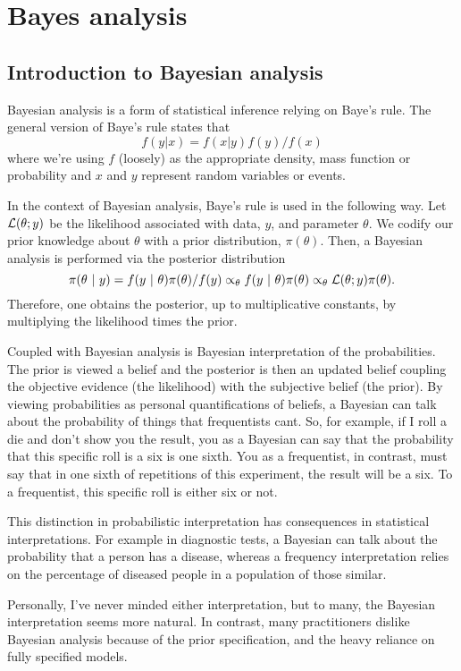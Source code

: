\chapter{Bayes analysis}

\section{Introduction to Bayesian analysis}

Bayesian analysis is a form of statistical inference
relying on Baye's rule. The general version of Baye's rule states
that 
$$
f(y | x) = f(x | y) f(y) / f(x)
$$
where we're using $f$ (loosely) as the appropriate density, mass function
or probability and $x$ and $y$ represent random variables or events. 

In the context of Bayesian analysis, Baye's rule is used in the following
way. Let ${\cal L}(\theta; y)$ be the likelihood associated with data, $y$,
and  parameter $\theta$. We codify our prior knowledge about $\theta$ with
a prior distribution, $\pi(\theta)$. Then, a Bayesian analysis is performed
via the posterior distribution 
$$
\pi(\theta ~|~ y) = f(y ~|~ \theta) \pi(\theta) / f(y) 
\propto_\theta f(y ~|~ \theta) \pi(\theta) \propto_\theta {\cal L}(\theta; y) \pi(\theta).
$$
Therefore, one obtains the posterior, up to multiplicative constants, 
by multiplying the likelihood times the prior. 

Coupled with Bayesian analysis is Bayesian interpretation of the probabilities.
The prior is viewed a belief and the posterior is then an updated belief
coupling the objective evidence (the likelihood) with the subjective 
belief (the prior). By viewing probabilities as personal quantifications
of beliefs, a Bayesian can talk about the probability of things that frequentists
cant. So, for example, if I roll a die and don't show you the result, you as a Bayesian
can say that the probability that this specific roll is a six is one sixth. You as a frequentist,
in contrast, must say that in one sixth of repetitions of this experiment, the result
will be a six. To a frequentist, this specific roll is either six or not. 

This distinction in probabilistic interpretation 
has consequences in statistical interpretations. For example in
diagnostic tests,  a Bayesian can talk about the probability that a person has a disease, whereas
a frequency interpretation relies on the percentage  of diseased people in a 
population of those similar. 

Personally, I've never minded either interpretation,
but to many, the Bayesian interpretation seems more natural. In contrast, many
practitioners dislike Bayesian analysis because of the prior specification, and
the heavy reliance on fully specified models. 

